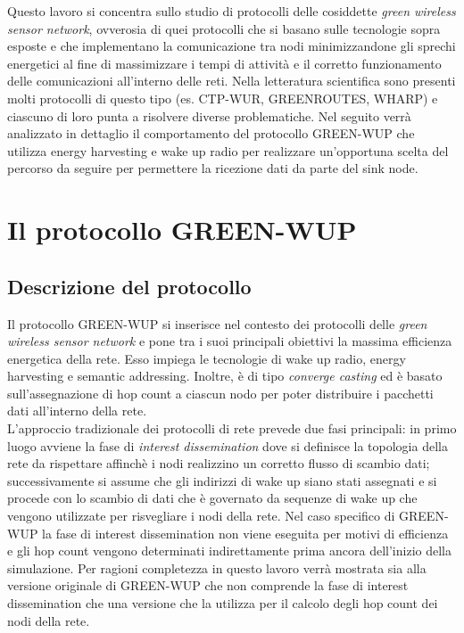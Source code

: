 \documentclass[binding=0.6cm,TFA]{sapthesis}
\begin{document}
Questo lavoro si concentra sullo studio di protocolli delle cosiddette \emph{green wireless sensor network}, ovverosia di quei protocolli che si basano
sulle tecnologie sopra esposte e che implementano la comunicazione tra nodi minimizzandone gli sprechi energetici al fine di massimizzare
i tempi di attività e il corretto funzionamento delle comunicazioni all'interno delle reti. Nella letteratura scientifica
sono presenti molti protocolli di questo tipo (es. CTP-WUR, GREENROUTES, WHARP) e ciascuno di loro punta a risolvere diverse problematiche.
Nel seguito verrà analizzato in dettaglio il comportamento del protocollo GREEN-WUP che utilizza energy harvesting e wake up radio per realizzare
un'opportuna scelta del percorso da seguire per permettere la ricezione dati da parte del sink node.\\

\chapter{Il protocollo GREEN-WUP}

\section{Descrizione del protocollo}

Il protocollo GREEN-WUP si inserisce nel contesto dei protocolli delle \emph{green wireless sensor network} e pone tra i suoi principali obiettivi
la massima efficienza energetica della rete. Esso impiega le tecnologie di wake up radio, energy harvesting e semantic addressing. Inoltre, è
di tipo \emph{converge casting} ed è basato sull'assegnazione di hop count a ciascun nodo per poter distribuire i pacchetti dati
all'interno della rete.\\

L'approccio tradizionale dei protocolli di rete prevede due fasi principali: in primo luogo avviene la fase di \emph{interest dissemination} dove si
definisce la topologia della rete da rispettare affinchè i nodi realizzino un corretto flusso di scambio dati; successivamente si assume che gli
indirizzi di wake up siano stati assegnati e si procede con lo scambio di dati che è governato da sequenze di wake up che vengono utilizzate per
risvegliare i nodi della rete. Nel caso specifico di GREEN-WUP la fase di interest dissemination non viene eseguita per motivi di efficienza
e gli hop count vengono determinati indirettamente prima ancora dell'inizio della simulazione. Per ragioni completezza in questo lavoro verrà
mostrata sia alla versione originale di GREEN-WUP che non comprende la fase di interest dissemination che una versione che la utilizza per
il calcolo degli hop count dei nodi della rete.\\
\end{document}
